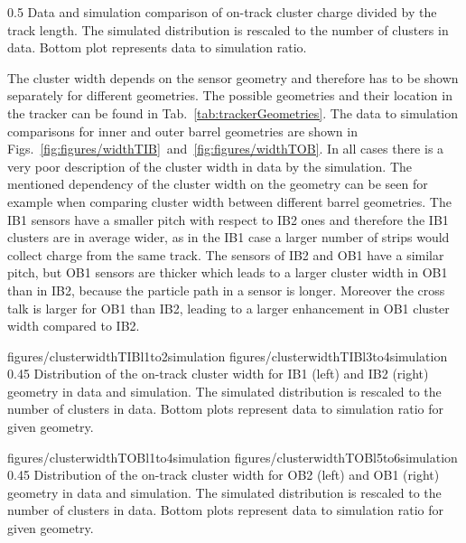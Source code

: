                  {0.5}       %
                 { Data and simulation comparison of on-track cluster charge divided by the track length. The simulated distribution is rescaled to the number of clusters in data. Bottom plot represents data to simulation ratio. }

The cluster width depends on the sensor geometry and therefore has to be shown separately for different geometries. The possible geometries and their location in the tracker can be found in Tab.~\ref{tab:trackerGeometries}. The data to simulation comparisons for inner and outer barrel geometries are shown in Figs.~\ref{fig:figures/widthTIB}~and~\ref{fig:figures/widthTOB}. In all cases there is a very poor description of the cluster width in data by the simulation. The mentioned dependency of the cluster width on the geometry can be seen for example when comparing cluster width between different barrel geometries. The IB1 sensors have a smaller pitch with respect to IB2 ones and therefore the IB1 clusters are in average wider, as in the IB1 case a larger number of strips would collect charge from the same track. The sensors of IB2 and OB1 have a similar pitch, but OB1 sensors are thicker which leads to a larger cluster width in OB1 than in IB2, because the particle path in a sensor is longer. Moreover the cross talk is larger for OB1 than IB2, leading to a larger enhancement in OB1 cluster width compared to IB2.


                 {figures/clusterwidthTIBl1to2simulation}
                 {figures/clusterwidthTIBl3to4simulation} %
                 {0.45}       %
                 { Distribution of the on-track cluster width for IB1 (left) and IB2 (right) geometry in data and simulation. The simulated distribution is rescaled to the number of clusters in data. Bottom plots represent data to simulation ratio for given geometry. }

                 {figures/clusterwidthTOBl1to4simulation}
                 {figures/clusterwidthTOBl5to6simulation} %
                 {0.45}       %
                 { Distribution of the on-track cluster width for OB2 (left) and OB1 (right) geometry in data and simulation. The simulated distribution is rescaled to the number of clusters in data. Bottom plots represent data to simulation ratio for given geometry. }


